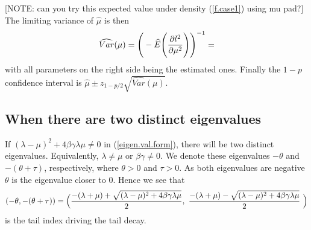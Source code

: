\documentclass[11pt]{article}
\newcommand{\cred}{ \color{red}}
\begin{document}
{\cred [NOTE: can you try this expected value under density (\ref{f.case1})  using mu pad?]}\\


The limiting variance of $\hat{\mu}$ is then
\begin{equation}
\label{ }
   \widehat{Var}(\mu)= \Bigg{(}-{\widehat{E}}\Bigg{(}\frac{\partial l^2}{\partial \mu^2} \Bigg{)} \Bigg{)}^{-1}=%
\end{equation} with all parameters on the right side being the estimated ones. Finally the $1-p$ confidence interval is $\hat{\mu} \pm z_{1-p/2}\sqrt{\widehat{Var}(\mu)}.$

\subsection{When there are two distinct eigenvalues}
If $(\lambda-\mu)^2+4\beta \gamma \lambda \mu  \ne 0$ in (\ref{eigen.val.form}), there will be two distinct eigenvalues. Equivalently, $\lambda \ne \mu$ or $\beta \gamma \ne 0$. We denote these eigenvalues $-\theta$ and $-( \theta+\tau)$, respectively, where $\theta >0$ and $ \tau >0$. As both eigenvalues are negative $\theta$ is the eigenvalue closer to 0. Hence we see that \begin{equation}
\label{ }
(-\theta, -(\theta+\tau))=\Big{(} \frac{-(\lambda+\mu) +\sqrt{(\lambda-\mu)^2+4\beta \gamma\lambda \mu}}{2}, \,\, \frac{-(\lambda+\mu) -\sqrt{(\lambda-\mu)^2+4\beta \gamma\lambda \mu}}{2}\,\, \Big{)}
\end{equation}
is the tail index driving the tail decay.\\
\end{document}

